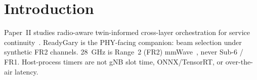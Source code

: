 \section{Introduction}
Paper~II studies radio-aware twin-informed cross-layer orchestration for service continuity~\cite{itur_m2160,3gpp_ts22261}.
ReadyGary is the PHY-facing companion: beam selection under synthetic FR2 channels.
28~GHz is Range~2 (FR2) mmWave~\cite{3gpp_ts38101_2}, never Sub-6 / FR1.
Host-process timers are not gNB slot time, ONNX/TensorRT, or over-the-air latency.
